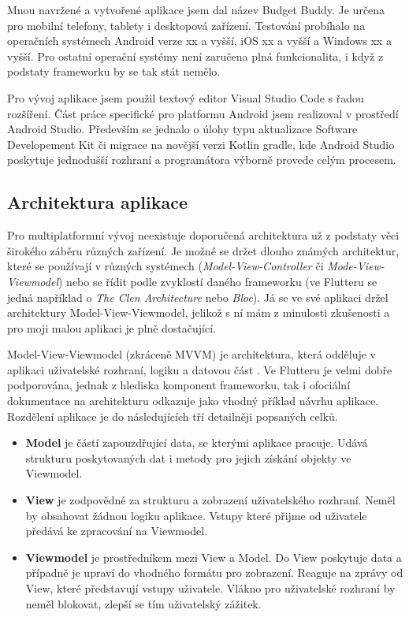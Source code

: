 \documentclass[
  biblatex,
  figures=true,
  tables=false,
  glossaries,
  index
]{kidiplom}
\begin{document}
Mnou navržené a vytvořené aplikace jsem dal název Budget Buddy. Je určena pro mobilní telefony, tablety i desktopová zařízení. Testování probíhalo na operačních systémech Android verze xx a vyšší, iOS xx a vyšší a Windows xx a vyšší. Pro ostatní operační systémy není zaručena plná funkcionalita, i když z podstaty frameworku by se tak stát nemělo.

Pro vývoj aplikace jsem použil textový editor Visual Studio Code s řadou rozšíření. Část práce specifické pro platformu Android jsem realizoval v prostředí Android Studio. Především se jednalo o úlohy typu aktualizace Software Developement Kit či migrace na novější verzi Kotlin gradle, kde Android Studio poskytuje jednodušší rozhraní a programátora výborně provede celým procesem.

\subsection{Architektura aplikace}
Pro multiplatformní vývoj neexistuje doporučená architektura už z podstaty věci širokého záběru různých zařízení. Je možné se držet dlouho známých architektur, které se používají v různých systémech (\textit{Model-View-Controller} či \textit{Mode-View-Viewmodel}) nebo se řídit podle zvyklostí daného frameworku (ve Flutteru se jedná například o \textit{The Clen Architecture} nebo \textit{Bloc}). Já se ve své aplikaci držel architektury Model-View-Viewmodel, jelikož s ní mám z minulosti zkušenosti a pro moji malou aplikaci je plně dostačující. 

Model-View-Viewmodel (zkráceně MVVM) je architektura, která odděluje v aplikaci uživatelské rozhraní, logiku a datovou část \cite{mvvm}. Ve Flutteru je velmi dobře podporována, jednak z hlediska komponent frameworku, tak i ofociální dokumentace na architekturu odkazuje jako vhodný příklad návrhu aplikace. Rozdělení aplikace je do následujících tří detailněji popsaných celků.
\begin{itemize}
  \item \textbf{Model} je částí zapouzdřující data, se kterými aplikace pracuje. Udává strukturu poskytovaných dat i metody pro jejich získání objekty ve Viewmodel.
  \item \textbf{View} je zodpovědné za strukturu a zobrazení uživatelského rozhraní. Neměl by obsahovat žádnou logiku aplikace. Vstupy které přijme od uživatele předává ke zpracování na Viewmodel. 
  \item \textbf{Viewmodel} je prostředníkem mezi View a Model. Do View poskytuje data a případně je upraví do vhodného formátu pro zobrazení. Reaguje na zprávy od View, které představují vstupy uživatele. Vlákno pro uživatelské rozhraní by neměl blokovat, zlepší se tím uživatelský zážitek.
\end{itemize}
\end{document}
